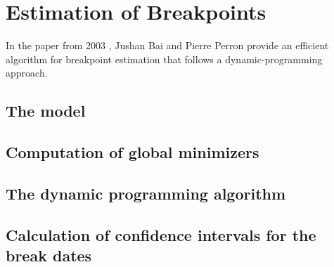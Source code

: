 \documentclass[main.tex]{subfiles}
\begin{document}
\section{Estimation of Breakpoints}
\label{sec:estimation_of_breakpoints}
In the paper from 2003 \cite{bai_perron}, Jushan Bai and Pierre Perron provide an
efficient algorithm for breakpoint estimation that follows a dynamic-programming approach.
\subsection{The model}
\label{subsec:breakpoints_the_model}

\subsection{Computation of global minimizers}
\label{subsec:breakpoints_the_model}

\subsection{The dynamic programming algorithm}
\label{subsec:the_dynamic_programming_algorithm}

\subsection{Calculation of confidence intervals for the break dates}
\label{subsec:confidence_intervals}



\biblio
\end{document}
